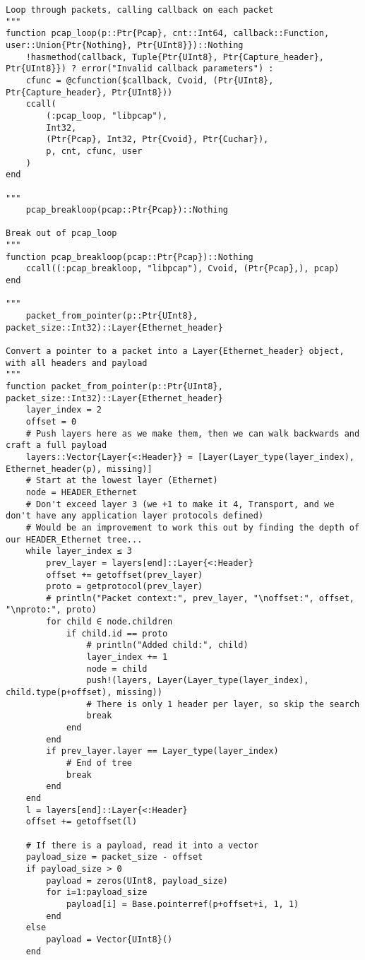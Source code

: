 \begin{lstlisting}[language=JuliaLocal, style=julia]
Loop through packets, calling callback on each packet
"""
function pcap_loop(p::Ptr{Pcap}, cnt::Int64, callback::Function, user::Union{Ptr{Nothing}, Ptr{UInt8}})::Nothing
    !hasmethod(callback, Tuple{Ptr{UInt8}, Ptr{Capture_header}, Ptr{UInt8}}) ? error("Invalid callback parameters") :
    cfunc = @cfunction($callback, Cvoid, (Ptr{UInt8}, Ptr{Capture_header}, Ptr{UInt8}))
    ccall(
        (:pcap_loop, "libpcap"),
        Int32,
        (Ptr{Pcap}, Int32, Ptr{Cvoid}, Ptr{Cuchar}),
        p, cnt, cfunc, user
    )
end

"""
    pcap_breakloop(pcap::Ptr{Pcap})::Nothing

Break out of pcap_loop
"""
function pcap_breakloop(pcap::Ptr{Pcap})::Nothing
    ccall((:pcap_breakloop, "libpcap"), Cvoid, (Ptr{Pcap},), pcap)
end

"""
    packet_from_pointer(p::Ptr{UInt8}, packet_size::Int32)::Layer{Ethernet_header}

Convert a pointer to a packet into a Layer{Ethernet_header} object, with all headers and payload
"""
function packet_from_pointer(p::Ptr{UInt8}, packet_size::Int32)::Layer{Ethernet_header}
    layer_index = 2
    offset = 0
    # Push layers here as we make them, then we can walk backwards and craft a full payload
    layers::Vector{Layer{<:Header}} = [Layer(Layer_type(layer_index), Ethernet_header(p), missing)]
    # Start at the lowest layer (Ethernet)
    node = HEADER_Ethernet
    # Don't exceed layer 3 (we +1 to make it 4, Transport, and we don't have any application layer protocols defined)
    # Would be an improvement to work this out by finding the depth of our HEADER_Ethernet tree...
    while layer_index ≤ 3
        prev_layer = layers[end]::Layer{<:Header}
        offset += getoffset(prev_layer)
        proto = getprotocol(prev_layer)
        # println("Packet context:", prev_layer, "\noffset:", offset, "\nproto:", proto)
        for child ∈ node.children
            if child.id == proto
                # println("Added child:", child)
                layer_index += 1
                node = child
                push!(layers, Layer(Layer_type(layer_index), child.type(p+offset), missing))
                # There is only 1 header per layer, so skip the search
                break
            end
        end
        if prev_layer.layer == Layer_type(layer_index)
            # End of tree
            break
        end
    end
    l = layers[end]::Layer{<:Header}
    offset += getoffset(l)

    # If there is a payload, read it into a vector
    payload_size = packet_size - offset
    if payload_size > 0
        payload = zeros(UInt8, payload_size)
        for i=1:payload_size
            payload[i] = Base.pointerref(p+offset+i, 1, 1)
        end
    else
        payload = Vector{UInt8}()
    end


\end{lstlisting}
